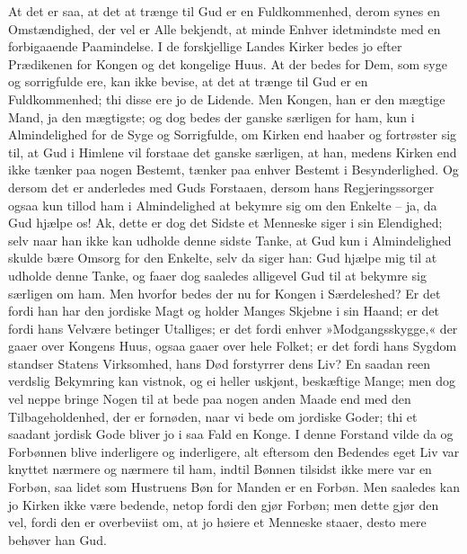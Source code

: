 \documentclass[12pt,a4paper]{article}
\begin{document}
At det er saa, at det at trænge til Gud er en Fuldkommenhed, derom synes en Omstændighed, der vel er Alle bekjendt, at minde Enhver idetmindste med en forbigaaende Paamindelse. I de forskjellige Landes Kirker bedes jo efter Prædikenen for Kongen og det kongelige Huus. At der bedes for Dem, som syge og sorrigfulde ere, kan ikke bevise, at det at trænge til Gud er en Fuldkommenhed; thi disse ere jo de Lidende. Men Kongen, han er den mægtige Mand, ja den mægtigste; og dog bedes der ganske særligen for ham, kun i Almindelighed for de Syge og Sorrigfulde, om Kirken end haaber og fortrøster sig til, at Gud i Himlene vil forstaae det ganske særligen, at han, medens Kirken end ikke tænker paa nogen Bestemt, tænker paa enhver Bestemt i Besynderlighed. Og dersom det er anderledes med Guds Forstaaen, dersom hans Regjeringssorger ogsaa kun tillod ham i Almindelighed at bekymre sig om den Enkelte – ja, da Gud hjælpe os! Ak, dette er dog det Sidste et Menneske siger i sin Elendighed; selv naar han ikke kan udholde denne sidste Tanke, at Gud kun i Almindelighed skulde bære Omsorg for den Enkelte, selv da siger han: Gud hjælpe mig til at udholde denne Tanke, og faaer dog saaledes alligevel Gud til at bekymre sig særligen om ham. Men hvorfor bedes der nu for Kongen i Særdeleshed? Er det fordi han har den jordiske Magt og holder Manges Skjebne i sin Haand; er det fordi hans Velvære betinger Utalliges; er det fordi enhver »Modgangsskygge,« der gaaer over Kongens Huus, ogsaa gaaer over hele Folket; er det fordi hans Sygdom standser Statens Virksomhed, hans Død forstyrrer dens Liv? En saadan reen verdslig Bekymring kan vistnok, og ei heller uskjønt, beskæftige Mange; men dog vel neppe bringe Nogen til at bede paa nogen anden Maade end med den Tilbageholdenhed, der er fornøden, naar vi bede om jordiske Goder; thi et saadant jordisk Gode bliver jo i saa Fald en Konge. I denne Forstand vilde da og Forbønnen blive inderligere og inderligere, alt eftersom den Bedendes eget Liv var knyttet nærmere og nærmere til ham, indtil Bønnen tilsidst ikke mere var en Forbøn, saa lidet som Hustruens Bøn for Manden er en Forbøn. Men saaledes kan jo Kirken ikke være bedende, netop fordi den gjør Forbøn; men dette gjør den vel, fordi den er overbeviist om, at jo høiere et Menneske staaer, desto mere behøver han Gud.
\end{document}

